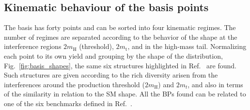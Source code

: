 \subsection{Kinematic behaviour of the basis points}
\label{sec:validation_shapes}
\label{sec:validation_nsamples}

The basis has forty points and can be sorted into four kinematic regimes. The number of regimes are separated according to the behavior of the shape at the interference regions $2m_{\text{H}}$ (threshold), $2m_{\text{t}}$, and in the high-mass tail. Normalizing each point to its own yield and grouping by the shape of the \mHH distribution, Fig.~\ref{fig:basis_shapes}, the same six structures highlighted in Ref.~\cite{Bär:2965348} are found. Such structures are given according to the rich diversity arisen from the interferences around the production threshold ($2m_\text{H}$) and $2m_t$, and also in terms of the similarity in relation to the SM shape. All the BPs found can be related to one of the six benchmarks defined in Ref.~\cite{Bär:2965348}.



